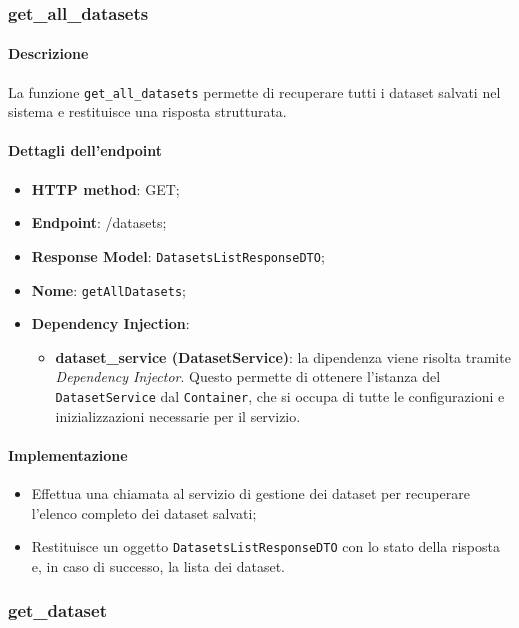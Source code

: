 \label{subsubsec:funzioni_dataset}
\subsubsection{get\_all\_datasets}
\paragraph{Descrizione}
La funzione \texttt{get\_all\_datasets} permette di recuperare tutti i dataset salvati nel sistema e restituisce una risposta strutturata.
\paragraph{Dettagli dell'endpoint}
\begin{itemize}
    \item \textbf{HTTP method}: GET;
    \item \textbf{Endpoint}: /datasets;
    \item \textbf{Response Model}: \texttt{DatasetsListResponseDTO};
    \item \textbf{Nome}: \texttt{getAllDatasets};
    \item \textbf{Dependency Injection}: 
    \begin{itemize}
    \item \textbf{dataset\_service (DatasetService)}: la dipendenza viene risolta tramite \textit{Dependency Injector}. Questo permette di ottenere l'istanza del \texttt{DatasetService} dal \texttt{Container}, che si occupa di tutte le configurazioni e inizializzazioni necessarie per il servizio.
    \end{itemize}
\end{itemize}
\paragraph{Implementazione}
\begin{itemize}
    \item Effettua una chiamata al servizio di gestione dei dataset per recuperare l'elenco completo dei dataset salvati;
    \item Restituisce un oggetto \texttt{DatasetsListResponseDTO} con lo stato della risposta e, in caso di successo, la lista dei dataset.
\end{itemize}

\subsubsection{get\_dataset}
